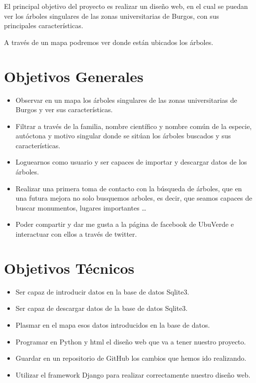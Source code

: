 
El principal objetivo del proyecto es realizar un diseño web, en el cual se puedan ver los árboles singulares de las zonas universitarias de Burgos, con sus principales características.

A través de un mapa podremos ver donde están ubicados los árboles. 
\section{Objetivos Generales}
\begin{itemize}
	\item Observar en un mapa los árboles singulares de las zonas universitarias de Burgos y ver sus características.
	\item Filtrar a través de la familia, nombre científico y nombre común de la especie, autóctona y motivo singular donde se sitúan los árboles buscados y sus características.
	\item Loguearnos como usuario y ser capaces de importar y descargar datos de los árboles.
	\item Realizar una primera toma de contacto con la búsqueda de árboles, que en una futura mejora no solo busquemos arboles, es decir, que seamos capaces de buscar monumentos, lugares importantes \ldots
	\item Poder compartir y dar me gusta a la página de facebook de UbuVerde e interactuar con ellos a través de twitter. 
\end{itemize}
\newpage

\section{Objetivos Técnicos}
\begin{itemize}
	\item Ser capaz de introducir datos en la base de datos Sqlite3.
	\item Ser capaz de descargar datos de la base de datos Sqlite3.
	\item Plasmar en el mapa esos datos introducidos en la base de datos. 
	\item Programar en Python y html el diseño web que va a tener nuestro proyecto.
	\item Guardar en un repositorio de GitHub los cambios que hemos ido realizando.
	\item Utilizar el framework Django para realizar correctamente nuestro diseño web.
	 
\end{itemize}